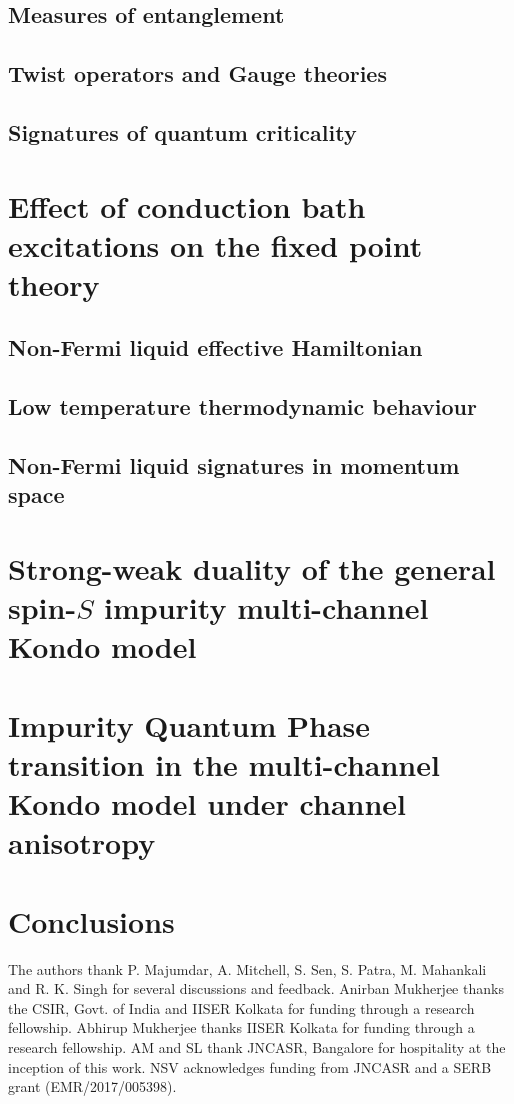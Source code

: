 \documentclass[reprint,prb,superscriptaddress]{revtex4-2}
\begin{document}
\subsection{Measures of entanglement}
\lipsum[1-5]
\subsection{Twist operators and Gauge theories}
\lipsum[1-5]
\subsection{Signatures of quantum criticality}
\lipsum[1-5]

\section{Effect of conduction bath excitations on the fixed point theory}
\subsection{Non-Fermi liquid effective Hamiltonian}
\lipsum[1-5]
\subsection{Low temperature thermodynamic behaviour}
\lipsum[1-5]
\subsection{Non-Fermi liquid signatures in momentum space}
\lipsum[1-5]

\section{Strong-weak duality of the general spin-\(S\) impurity multi-channel Kondo model}
\lipsum[1-5]

\section{Impurity Quantum Phase transition in the multi-channel Kondo model under channel anisotropy}
\lipsum[1-5]

\section{Conclusions}
\lipsum[1-10]

\acknowledgments
The authors thank P. Majumdar, A. Mitchell, S. Sen, S. Patra, M. Mahankali and R. K. Singh for several discussions and feedback. Anirban Mukherjee thanks the CSIR, Govt. of India and IISER Kolkata for funding through a research fellowship. Abhirup Mukherjee thanks IISER Kolkata for funding through a research fellowship. AM and SL thank JNCASR, Bangalore for hospitality at the inception of this work. NSV acknowledges funding from JNCASR and a SERB grant (EMR/2017/005398).

\appendix

\end{document}
